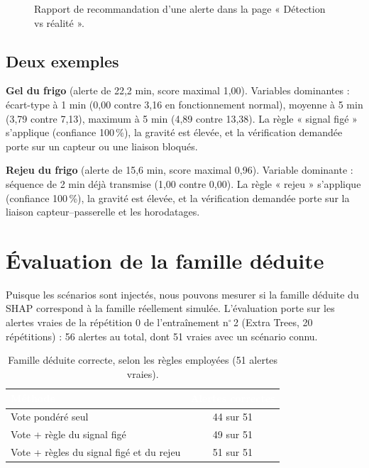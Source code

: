 \begin{figure}[H]
\centering
{}
\caption{Rapport de recommandation d'une alerte dans la page « Détection vs
réalité ».}
\label{fig:expl_capture_rapport}
\end{figure}

\subsection{Deux exemples}

\textbf{Gel du frigo} (alerte de 22,2 min, score maximal 1,00). Variables
dominantes : écart-type à 1 min (0,00 contre 3,16 en fonctionnement normal),
moyenne à 5 min (3,79 contre 7,13), maximum à 5 min (4,89 contre 13,38). La
règle « signal figé » s'applique (confiance 100\,\%), la gravité est élevée, et
la vérification demandée porte sur un capteur ou une liaison bloqués.

\textbf{Rejeu du frigo} (alerte de 15,6 min, score maximal 0,96). Variable
dominante : séquence de 2 min déjà transmise (1,00 contre 0,00). La règle
« rejeu » s'applique (confiance 100\,\%), la gravité est élevée, et la
vérification demandée porte sur la liaison capteur--passerelle et les
horodatages.


\section{Évaluation de la famille déduite}
\label{sec:expl_eval}

Puisque les scénarios sont injectés, nous pouvons mesurer si la famille déduite
du SHAP correspond à la famille réellement simulée. L'évaluation porte sur les
alertes vraies de la répétition 0 de l'entraînement n$^\circ$\,2 (Extra Trees,
20 répétitions) : 56 alertes au total, dont 51 vraies avec un scénario connu.

\begin{table}[H]
\centering
\small
\renewcommand{\arraystretch}{1.3}
\caption{Famille déduite correcte, selon les règles employées (51 alertes
vraies).}
\label{tab:expl_eval}
\begin{tabular}{|l|c|}
\hline
\rowcolor{thead}
\textcolor{white}{\textbf{Méthode}} & \textcolor{white}{\textbf{Alertes correctes}} \\
\hline
Vote pondéré seul & 44 sur 51 \\
\rowcolor{trowa}
Vote + règle du signal figé & 49 sur 51 \\
Vote + règles du signal figé et du rejeu & 51 sur 51 \\
\hline
\end{tabular}
\end{table}


